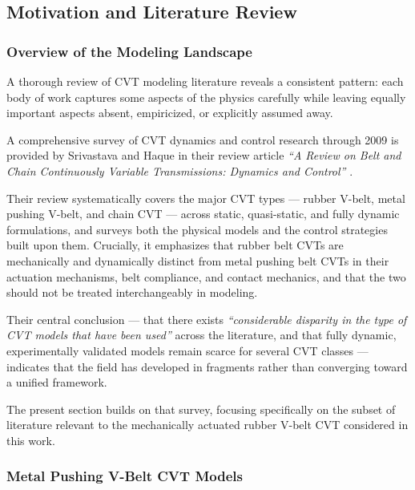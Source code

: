 \documentclass[11pt]{article}
\numberwithin{equation}{section}
\begin{document}
\subsection{Motivation and Literature Review}
\label{sec:intro_lit}

\subsubsection{Overview of the Modeling Landscape}

A thorough review of CVT modeling literature reveals a consistent pattern:
each body of work captures some aspects of the physics carefully while leaving
equally important aspects absent, empiricized, or explicitly assumed away.

A comprehensive survey of CVT dynamics and control research through 2009 is
provided by Srivastava and Haque in their review article
\emph{``A Review on Belt and Chain Continuously Variable Transmissions:
Dynamics and Control''} \cite{Srivastava2009}.

Their review systematically covers the major CVT types --- rubber V-belt,
metal pushing V-belt, and chain CVT --- across static, quasi-static, and
fully dynamic formulations, and surveys both the physical models and the
control strategies built upon them. Crucially, it emphasizes that rubber
belt CVTs are mechanically and dynamically distinct from metal pushing
belt CVTs in their actuation mechanisms, belt compliance, and contact
mechanics, and that the two should not be treated interchangeably in
modeling.

Their central conclusion --- that there exists
\emph{``considerable disparity in the type of CVT models that have been used''}
across the literature, and that fully dynamic, experimentally validated
models remain scarce for several CVT classes --- indicates that the field
has developed in fragments rather than converging toward a unified
framework.

The present section builds on that survey, focusing specifically on the
subset of literature relevant to the mechanically actuated rubber
V-belt CVT considered in this work.

\subsubsection{Metal Pushing V-Belt CVT Models}
\end{document}

